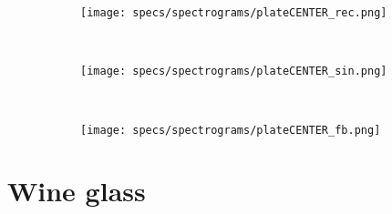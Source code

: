 \begin{figure}[H]
    \begin{subfigure}[b]{0.25\textwidth}
        \texttt{[image: specs/spectrograms/plateCENTER\_rec.png]}
    \end{subfigure}%
    ~ %
    \begin{subfigure}[b]{0.25\textwidth}
        \texttt{[image: specs/spectrograms/plateCENTER\_sin.png]}
    \end{subfigure}%
    ~ %
    \begin{subfigure}[b]{0.25\textwidth}
        \texttt{[image: specs/spectrograms/plateCENTER\_fb.png]}
    \end{subfigure}%
\end{figure}

\section*{Wine glass}

